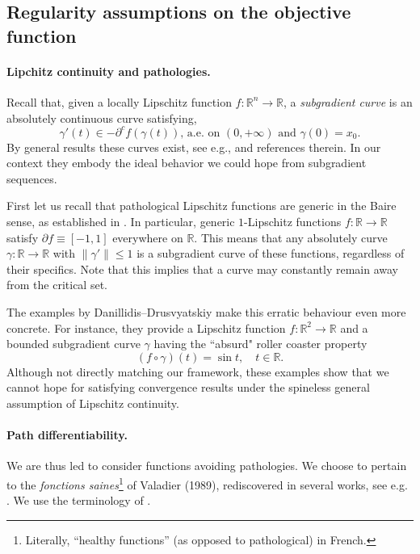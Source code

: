 \documentclass[11pt]{article}
\theoremstyle{definition}
\theoremstyle{remark}
\newcommand{\R}{\mathbb{R}}
\renewcommand{\leq}{\leqslant}
\begin{document}
\subsection{Regularity assumptions on the objective function}

\paragraph{Lipchitz continuity and pathologies.}   Recall that, given a locally Lipschitz function $f\colon\R^n\to\R$,  a {\em subgradient curve}  is an absolutely continuous curve satisfying,
\[\gamma'(t)\in-\partial^cf(\gamma(t)), \, \mbox{a.e. on $(0,+\infty)$ and }\gamma(0)=x_0.\]
By general results these curves exist, see e.g., \cite{BHS}  and references therein. In our context they embody the ideal behavior  we could hope from subgradient sequences.

First let us recall that  pathological Lipschitz functions are generic in the Baire sense, as established in \cite{Wang1999FineAP,borwein2001generalized}. In particular, generic $1$-Lipschitz functions $f:\R\to\R$ satisfy $\partial f\equiv [-1,1]$ everywhere on $\R$. This means that any absolutely curve $\gamma:\R\to\R$ with $\|\gamma'\|\leq 1$ is a subgradient curve of these functions, regardless of their specifics. Note that this implies that a curve may constantly remain away from the critical set.

The examples by Danillidis--Drusvyatskiy \cite{daniilidisdrusvyatskiy} make this erratic behaviour even more concrete. For instance, they provide a Lipschitz function $f\colon \R^2\to\R$ and a bounded subgradient curve $\gamma$ having the ``absurd" roller coaster property
\[(f\circ \gamma)(t)=\sin t,\quad t\in\R.\] 
Although not directly matching our framework, these examples show that we cannot hope for  satisfying convergence results under the  spineless  general assumption of Lipschitz continuity.


\paragraph{Path differentiability.}  We are thus led to consider functions avoiding pathologies. We choose to pertain to the  {\em fonctions saines}\footnote{Literally, ``healthy functions'' (as opposed to pathological) in French.} %
of Valadier \cite{valadier} (1989), rediscovered in several works, see e.g.  \cite{borwein,Davis2019,boltepauwels}. We   use the terminology of \cite{boltepauwels}.
%
\end{document}
